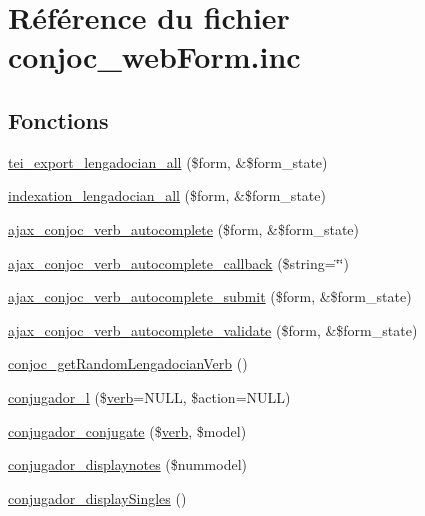 \hypertarget{conjoc__web_form_8inc}{}\section{Référence du fichier conjoc\+\_\+web\+Form.\+inc}
\label{conjoc__web_form_8inc}
\subsection*{Fonctions}
\begin{DoxyCompactItemize}
\item 
\hyperlink{conjoc__web_form_8inc_a9c7725a828c1a44761bc51fe7a346215}{tei\+\_\+export\+\_\+lengadocian\+\_\+all} (\$form, \&\$form\+\_\+state)
\item 
\hyperlink{conjoc__web_form_8inc_a465cce16b0d09f364ccb546c46c82306}{indexation\+\_\+lengadocian\+\_\+all} (\$form, \&\$form\+\_\+state)
\item 
\hyperlink{conjoc__web_form_8inc_a3698c970fd73cda200a3a459dc50beec}{ajax\+\_\+conjoc\+\_\+verb\+\_\+autocomplete} (\$form, \&\$form\+\_\+state)
\item 
\hyperlink{conjoc__web_form_8inc_a5ea54e98ecadf55b7fe917fe6237a52e}{ajax\+\_\+conjoc\+\_\+verb\+\_\+autocomplete\+\_\+callback} (\$string=\char`\"{}\char`\"{})
\item 
\hyperlink{conjoc__web_form_8inc_add934c4187ded056db9c8369764a51ed}{ajax\+\_\+conjoc\+\_\+verb\+\_\+autocomplete\+\_\+submit} (\$form, \&\$form\+\_\+state)
\item 
\hyperlink{conjoc__web_form_8inc_ae85a92c4f091005289a97fb20b8762ef}{ajax\+\_\+conjoc\+\_\+verb\+\_\+autocomplete\+\_\+validate} (\$form, \&\$form\+\_\+state)
\item 
\hyperlink{conjoc__web_form_8inc_aacc782a067b5e8fdaeca34be9a282c61}{conjoc\+\_\+get\+Random\+Lengadocian\+Verb} ()
\item 
\hyperlink{conjoc__web_form_8inc_aab99a7a60692cf7228d4a79924c32cb2}{conjugador\+\_\+l} (\$\hyperlink{teibase_8php_aa8d8fadfcf4239c7aa288414da9d0ace}{verb}=N\+U\+LL, \$action=N\+U\+LL)
\item 
\hyperlink{conjoc__web_form_8inc_a5d341264c049e9bda5fd2d0acce4dfd7}{conjugador\+\_\+conjugate} (\$\hyperlink{teibase_8php_aa8d8fadfcf4239c7aa288414da9d0ace}{verb}, \$model)
\item 
\hyperlink{conjoc__web_form_8inc_a16562f736e2ff741407adb1ceb3c9170}{conjugador\+\_\+displaynotes} (\$nummodel)
\item 
\hyperlink{conjoc__web_form_8inc_ac41ee7cf6ccd6dd46de8112c7c315cfe}{conjugador\+\_\+display\+Singles} ()

\end{DoxyCompactItemize}
